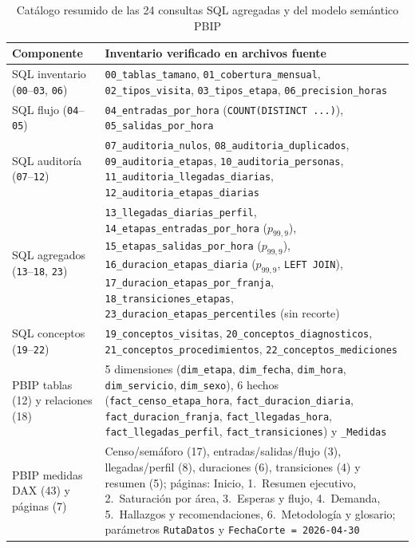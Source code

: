 \begin{table}[t]
\caption{Catálogo resumido de las 24 consultas SQL agregadas y del modelo semántico PBIP}
\label{tab:anexo_sql_pbip}
\centering
\scriptsize
\begin{tabularx}{\textwidth}{@{}L{0.24\textwidth} Y@{}}
\toprule
Componente & Inventario verificado en archivos fuente \\
\midrule
SQL inventario (\texttt{00}--\texttt{03}, \texttt{06}) & \texttt{00\_tablas\_tamano}, \texttt{01\_cobertura\_mensual}, \texttt{02\_tipos\_visita}, \texttt{03\_tipos\_etapa}, \texttt{06\_precision\_horas} \\
SQL flujo (\texttt{04}--\texttt{05}) & \texttt{04\_entradas\_por\_hora} (\texttt{COUNT(DISTINCT ...)}), \texttt{05\_salidas\_por\_hora} \\
SQL auditoría (\texttt{07}--\texttt{12}) & \texttt{07\_auditoria\_nulos}, \texttt{08\_auditoria\_duplicados}, \texttt{09\_auditoria\_etapas}, \texttt{10\_auditoria\_personas}, \texttt{11\_auditoria\_llegadas\_diarias}, \texttt{12\_auditoria\_etapas\_diarias} \\
SQL agregados (\texttt{13}--\texttt{18}, \texttt{23}) & \texttt{13\_llegadas\_diarias\_perfil}, \texttt{14\_etapas\_entradas\_por\_hora} ($p_{99{,}9}$), \texttt{15\_etapas\_salidas\_por\_hora} ($p_{99{,}9}$), \texttt{16\_duracion\_etapas\_diaria} ($p_{99{,}9}$, \texttt{LEFT JOIN}), \texttt{17\_duracion\_etapas\_por\_franja}, \texttt{18\_transiciones\_etapas}, \texttt{23\_duracion\_etapas\_percentiles} (sin recorte) \\
SQL conceptos (\texttt{19}--\texttt{22}) & \texttt{19\_conceptos\_visitas}, \texttt{20\_conceptos\_diagnosticos}, \texttt{21\_conceptos\_procedimientos}, \texttt{22\_conceptos\_mediciones} \\
\midrule
PBIP tablas (12) y relaciones (18) & 5 dimensiones (\texttt{dim\_etapa}, \texttt{dim\_fecha}, \texttt{dim\_hora}, \texttt{dim\_servicio}, \texttt{dim\_sexo}), 6 hechos (\texttt{fact\_censo\_etapa\_hora}, \texttt{fact\_duracion\_diaria}, \texttt{fact\_duracion\_franja}, \texttt{fact\_llegadas\_hora}, \texttt{fact\_llegadas\_perfil}, \texttt{fact\_transiciones}) y \texttt{\_Medidas} \\
PBIP medidas DAX (43) y páginas (7) & Censo/semáforo (17), entradas/salidas/flujo (3), llegadas/perfil (8), duraciones (6), transiciones (4) y resumen (5); páginas: Inicio, 1.~Resumen ejecutivo, 2.~Saturación por área, 3.~Esperas y flujo, 4.~Demanda, 5.~Hallazgos y recomendaciones, 6.~Metodología y glosario; parámetros \texttt{RutaDatos} y \texttt{FechaCorte = 2026-04-30} \\
\bottomrule
\end{tabularx}
\end{table}


